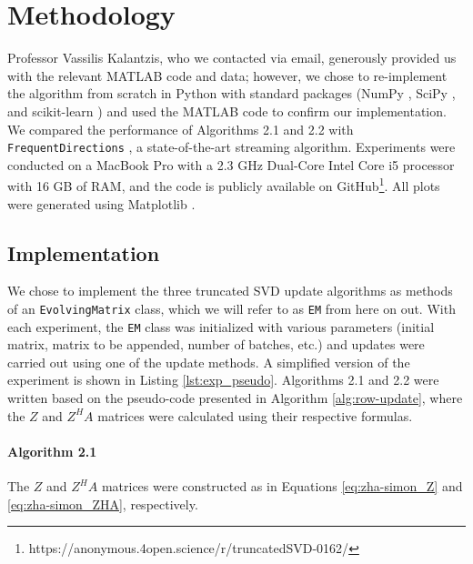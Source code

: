 \section{Methodology} \label{sec:methods}

Professor Vassilis Kalantzis, who we contacted via email, generously provided us with the relevant MATLAB code and data; however, we chose to re-implement the algorithm from scratch in Python with standard packages (NumPy \cite{numpy}, SciPy \cite{scipy}, and scikit-learn \cite{scikit-learn}) and used the MATLAB code to confirm our implementation.
We compared the performance of Algorithms 2.1 and 2.2 with \verb|FrequentDirections| \cite{Ghashami2016}, a state-of-the-art streaming algorithm.
Experiments were conducted on a MacBook Pro with a 2.3 GHz Dual-Core Intel Core i5 processor with 16 GB of RAM, and the code is publicly available on GitHub\footnote{https://anonymous.4open.science/r/truncatedSVD-0162/}.
All plots were generated using Matplotlib \cite{matplotlib}.

\subsection{Implementation}

We chose to implement the three truncated SVD update algorithms as methods of an \verb|EvolvingMatrix| class, which we will refer to as \verb|EM| from here on out.
With each experiment, the \verb|EM| class was initialized with various parameters (initial matrix, matrix to be appended, number of batches, etc.) and updates were carried out using one of the update methods.
A simplified version of the experiment is shown in Listing \ref{lst:exp_pseudo}.
Algorithms 2.1 and 2.2 were written based on the pseudo-code presented in Algorithm \ref{alg:row-update}, where the $Z$ and $Z^H A$ matrices were calculated using their respective formulas. 



\paragraph{Algorithm 2.1}

The $Z$ and $Z^H A$ matrices were constructed as in Equations \ref{eq:zha-simon_Z} and \ref{eq:zha-simon_ZHA}, respectively. 

